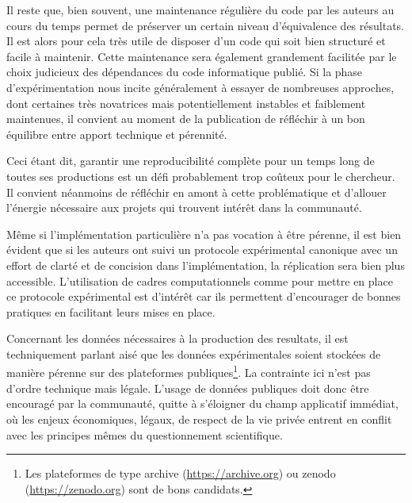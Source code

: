 Il reste que, bien souvent, une maintenance régulière du code par les auteurs au cours du temps permet de préserver un certain niveau d'équivalence des résultats. Il est alors pour cela très utile de disposer d'un code qui soit bien structuré et facile à maintenir. Cette maintenance sera également grandement facilitée par le choix judicieux des dépendances du code informatique publié. Si la phase d'expérimentation nous incite généralement à essayer de nombreuses approches, dont certaines très novatrices mais potentiellement instables et faiblement maintenues, il convient au moment de la publication de réfléchir à un bon équilibre entre apport technique et pérennité.

Ceci étant dit, garantir une reproducibilité complète pour un temps long de toutes ses productions est un défi probablement trop coûteux pour le chercheur. Il convient néanmoins de réfléchir en amont à cette problématique et d'allouer l'énergie nécessaire aux projets qui trouvent intérêt dans la communauté.

Même si l'implémentation particulière n'a pas vocation à être pérenne, il est bien évident que si les auteurs ont suivi un protocole expérimental canonique avec un effort de clarté et de concision dans l'implémentation, la réplication sera bien plus accessible. L'utilisation de cadres computationnels comme \explanes pour mettre en place ce protocole expérimental est d'intérêt car ils permettent d'encourager de bonnes pratiques en facilitant leurs mises en place.

Concernant les données nécessaires à la production des resultats, il est techniquement parlant aisé que les données expérimentales soient stockées de manière pérenne sur des plateformes publiques\footnote{Les plateformes de type \textsf
{archive} (\url{https://archive.org}) ou \textsf
{zenodo} (\url{https://zenodo.org}) sont de bons candidats.}. La contrainte ici n'est pas d'ordre technique mais légale. L'usage de données publiques doit donc être encouragé par la communauté, quitte à s'éloigner du champ applicatif immédiat, où les enjeux économiques, légaux, de respect de la vie privée entrent en conflit avec les principes mêmes du questionnement scientifique.
